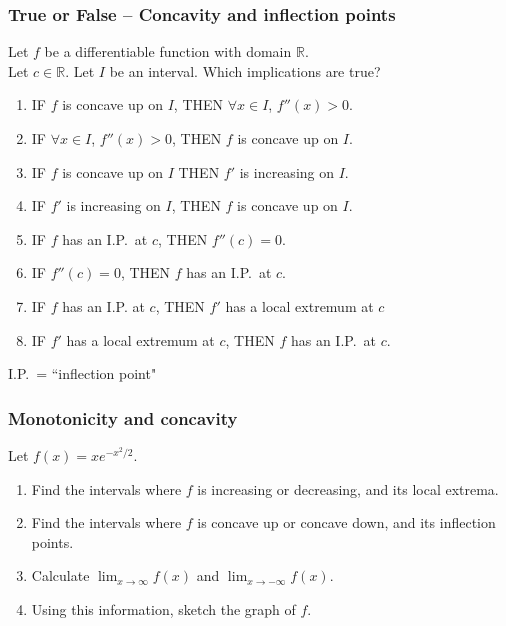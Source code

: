 \documentclass[14pt]{beamer}
\newcommand{\azul}[1]{{\color{blue} #1}}
\newcommand{\rojo}[1]{{\color{red} #1}}
\newcommand{\verde}[1]{{\color{verde} #1}}
\newcommand{\rosa}[1]{{\color{rosa} #1}}
\newcommand{\naranja}[1]{{\color{naranja} #1}}
\newcommand{\violeta}[1]{{\color{violet} #1}}
\newcommand{\setsize}[1]{\fontsize{#1}{#1}\selectfont} %
\newcommand{\smallerfont}{\setsize{13}} %
\begin{document}
	\begin{frame}[t]
		\smallerfont
		\frametitle{True or False -- Concavity and inflection points}

		Let $f$ be a {{differentiable}} function with domain $\mathbb{R}$. \\ Let $c
		\in \mathbb{R}$. Let $I$ be an interval. Which implications are true?

		\medskip
		\begin{enumerate}
			\item IF \rojo{$f$ is concave up on $I$}, \quad THEN \azul{$\forall x \in I$, $f''(x) >0$}.

			\item IF \azul{$\forall x \in I$, $f''(x) >0$}, \quad THEN \rojo{$f$ is concave up on $I$}.

			\item IF \rojo{$f$ is concave up on $I$} \quad THEN \verde{$f'$ is increasing on $I$}.

			\item IF \verde{$f'$ is increasing on $I$}, \quad THEN \rojo{$f$ is concave up on $I$}.

				\medskip

			\item IF \rosa{$f$ has an I.P.\ at $c$}, \quad THEN \naranja{$f''(c)=0$}.

			\item IF \naranja{$f''(c)=0$}, \quad THEN \rosa{$f$ has an I.P.\ at $c$}.

			\item IF \rosa{$f$ has an I.P. at $c$}, \quad THEN \violeta{$f'$ has a local extremum at $c$}

			\item IF \violeta{$f'$ has a local extremum at $c$}, \quad THEN \rosa{$f$ has an I.P.\ at $c$}.
		\end{enumerate}
		\medskip
		\begin{center}
			I.P.\  = ``inflection point"
		\end{center}
	\end{frame}
	\begin{frame}[t]
		\frametitle{Monotonicity and concavity}

		Let ${\displaystyle f(x) = x e^{-x^2/2}}$.

		\begin{enumerate}
			\item Find the intervals where $f$ is increasing or decreasing, and its
				local extrema.

			\item Find the intervals where $f$ is concave up or concave down, and its
				inflection points.

			\item Calculate ${\displaystyle \lim_{x \to \infty} f(x)}$ and ${\displaystyle \lim_{x \to - \infty} f(x)}$.

			\item Using this information, sketch the graph of $f$.
		\end{enumerate}
	\end{frame}
\end{document}
